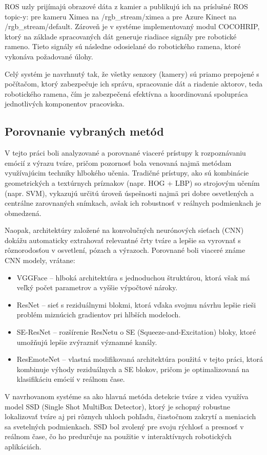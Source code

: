 ROS uzly prijímajú obrazové dáta z kamier a publikujú ich na príslušné ROS topic-y: pre kameru Ximea na /rgb\_stream/ximea a pre Azure Kinect na /rgb\_stream/default. Zároveň je v systéme implementovaný modul COCOHRIP, ktorý na základe spracovaných dát generuje riadiace signály pre robotické rameno. Tieto signály sú následne odosielané do robotického ramena, ktoré vykonáva požadované úlohy.

Celý systém je navrhnutý tak, že všetky senzory (kamery) sú priamo prepojené s počítačom, ktorý zabezpečuje ich správu, spracovanie dát a riadenie aktorov, teda robotického ramena, čím je zabezpečená efektívna a koordinovaná spolupráca jednotlivých komponentov pracoviska.

\subsection{Porovnanie vybraných metód}
V tejto práci boli analyzované a porovnané viaceré prístupy k rozpoznávaniu emócií z výrazu tváre, pričom pozornosť bola venovaná najmä metódam využívajúcim techniky hlbokého učenia. Tradičné prístupy, ako sú kombinácie geometrických a textúrnych príznakov (napr. HOG + LBP) so strojovým učením (napr. SVM), vykazujú určitú úroveň úspešnosti najmä pri dobre osvetlených a centrálne zarovnaných snímkach, avšak ich robustnosť v reálnych podmienkach je obmedzená.

Naopak, architektúry založené na konvolučných neurónových sieťach (CNN) dokážu automaticky extrahovať relevantné črty tváre a lepšie sa vyrovnať s rôznorodosťou v osvetlení, pózach a výrazoch. Porovnané boli viaceré známe CNN modely, vrátane:
\begin{itemize}
    \item VGGFace – hlboká architektúra s jednoduchou štruktúrou, ktorá však má veľký počet parametrov a vyššie výpočtové nároky.
    \item ResNet – sieť s reziduálnymi blokmi, ktorá vďaka svojmu návrhu lepšie rieši problém miznúcich gradientov pri hlbších modeloch.
    \item SE-ResNet – rozšírenie ResNetu o SE (Squeeze-and-Excitation) bloky, ktoré umožňujú lepšie zvýrazniť významné kanály.
    \item ResEmoteNet – vlastná modifikovaná architektúra použitá v tejto práci, ktorá kombinuje výhody reziduálnych a SE blokov, pričom je optimalizovaná na klasifikáciu emócií v reálnom čase.
\end{itemize}

V navrhovanom systéme sa ako hlavná metóda detekcie tváre z videa využíva model SSD (Single Shot MultiBox Detector), ktorý je schopný robustne lokalizovať tváre aj pri rôznych uhloch pohľadu, čiastočnom zakrytí a meniacich sa svetelných podmienkach. SSD bol zvolený pre svoju rýchlosť a presnosť v reálnom čase, čo ho predurčuje na použitie v interaktívnych robotických aplikáciách.

